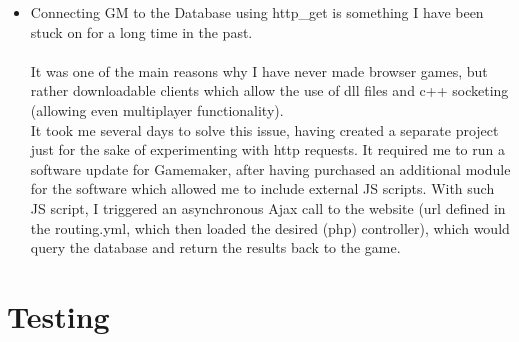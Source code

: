 \documentclass[12pt]{report}
\begin{document}
\begin{itemize}
\item Connecting GM to the Database using http\_get is something I have been stuck on for a long time in the past.\\\\
It was one of the main reasons why I have never made browser games, but rather downloadable clients which allow the use of dll files and c++ socketing (allowing even multiplayer functionality).\\
It took me several days to solve this issue, having created a separate project just for the sake of experimenting with http requests. It required me to run a software update for Gamemaker, after having purchased an additional module for the software which allowed me to include external JS scripts. With such JS script, I triggered an asynchronous Ajax call to the website (url defined in the routing.yml, which then loaded the desired (php) controller), which would query the database and return the results back to the game. 

\end{itemize}

\section*{Testing}
\end{document}
